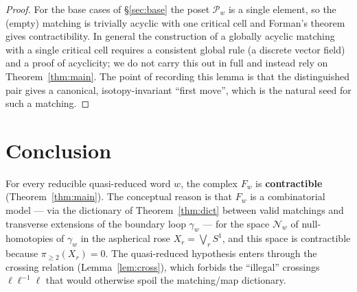 \documentclass[11pt]{article}
\theoremstyle{definition}
\theoremstyle{remark}
\newcommand{\rose}{X_r}
\begin{document}
\begin{proof}
For the base cases of \S\ref{sec:base} the poset $\mathcal P_w$ is a single
element, so the (empty) matching is trivially acyclic with one critical cell and
Forman's theorem gives contractibility. In general the construction of a globally
acyclic matching with a single critical cell requires a consistent global rule
(a discrete vector field) and a proof of acyclicity; we do not carry this out in
full and instead rely on Theorem~\ref{thm:main}. The point of recording this
lemma is that the distinguished pair gives a canonical, isotopy-invariant ``first
move'', which is the natural seed for such a matching.
\end{proof}

\section*{Conclusion}

For every reducible quasi-reduced word $w$, the complex $F_w$ is
\textbf{contractible} (Theorem~\ref{thm:main}). The conceptual reason is that
$F_w$ is a combinatorial model --- via the dictionary of
Theorem~\ref{thm:dict} between valid matchings and transverse extensions of the
boundary loop $\gamma_w$ --- for the space $\mathcal N_w$ of null-homotopies of
$\gamma_w$ in the aspherical rose $\rose=\bigvee_r S^1$, and this space is
contractible because $\pi_{\ge2}(\rose)=0$. The quasi-reduced hypothesis enters
through the crossing relation (Lemma~\ref{lem:cross}), which forbids the
``illegal'' crossings $\ell\ell^{-1}\ell$ that would otherwise spoil the
matching/map dictionary.
\end{document}

